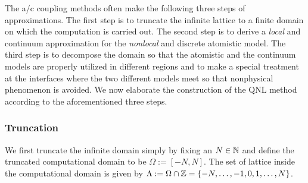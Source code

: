 	The a/c coupling methods often make the following three steps of approximations. The first step is to truncate the infinite lattice to a finite domain on which the computation is carried out. The second step is to derive a {\it local} and continuum approximation for the {\it nonlocal} and discrete atomistic model. The third step is to decompose the domain so that the atomistic and the continuum models are properly utilized in different regions and to make a special treatment at the interfaces where the two different models meet so that nonphysical phenomenon is avoided. We now elaborate the construction of the QNL method according to the aforementioned three steps.
	
	\subsubsection{Truncation}
	
	We first truncate the infinite domain simply by fixing an $N\in \mathbb{N}$ and define the truncated computational domain to be $\Omega:=[-N,N]$. The set of lattice inside the computational domain is given by $\Lambda := \Omega \cap \mathbb{Z} = \{-N, \ldots, -1, 0, 1, \ldots, N\}$. 
	
	
	
	
	
	
	
	
	
